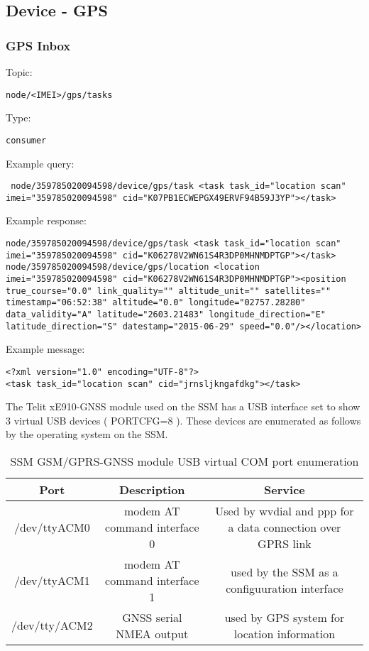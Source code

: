 \subsection{Device - GPS}
\subsubsection{GPS Inbox}

Topic:
\begin{lstlisting}node/<IMEI>/gps/tasks\end{lstlisting}
Type:
\begin{lstlisting}consumer\end{lstlisting}
Example query:
\begin{lstlisting} node/359785020094598/device/gps/task <task task_id="location scan" imei="359785020094598" cid="K07PB1ECWEPGX49ERVF94B59J3YP"></task>\end{lstlisting}
Example response:
\begin{lstlisting}node/359785020094598/device/gps/task <task task_id="location scan" imei="359785020094598" cid="K06278V2WN61S4R3DP0MHNMDPTGP"></task>
node/359785020094598/device/gps/location <location imei="359785020094598" cid="K06278V2WN61S4R3DP0MHNMDPTGP"><position true_course="0.0" link_quality="" altitude_unit="" satellites="" timestamp="06:52:38" altitude="0.0" longitude="02757.28280" data_validity="A" latitude="2603.21483" longitude_direction="E" latitude_direction="S" datestamp="2015-06-29" speed="0.0"/></location>\end{lstlisting}
Example message:
\begin{lstlisting}
<?xml version="1.0" encoding="UTF-8"?>
<task task_id="location scan" cid="jrnsljkngafdkg"></task>
\end{lstlisting}


The Telit xE910-GNSS module used on the SSM has a USB interface set to show 3 virtual USB devices ( PORTCFG=8 ). These devices are enumerated as follows by the operating system on the SSM.
\begin{table} 
    \centering
    \begin{tabular}{ c c c }
        \toprule
        Port & Description & Service \\ 
        \midrule
        /dev/ttyACM0 & modem AT command interface 0 & Used by wvdial and ppp for a data connection over GPRS link \\ 
        \midrule
        /dev/ttyACM1 & modem AT command interface 1 & used by the SSM as a configuuration interface \\ 
        \midrule
        /dev/tty/ACM2 & GNSS serial NMEA output & used by GPS system for location information \\ 
        \bottomrule
    \end{tabular} 
    \caption{SSM GSM/GPRS-GNSS module USB virtual COM port enumeration} 
\end{table}




